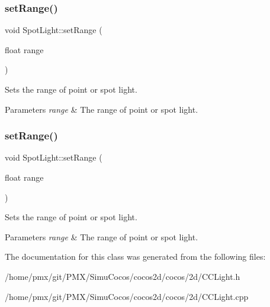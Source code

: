 \subsubsection{\texorpdfstring{set\+Range()}{setRange()}\hspace{0.1cm}{\footnotesize\ttfamily [1/2]}}
{\footnotesize\ttfamily void Spot\+Light\+::set\+Range (\begin{DoxyParamCaption}\item[{float}]{range }\end{DoxyParamCaption})\hspace{0.3cm}{\ttfamily [inline]}}

Sets the range of point or spot light.


\begin{DoxyParams}{Parameters}
{\em range} & The range of point or spot light. \\
\hline
\end{DoxyParams}
\mbox{\label{classSpotLight_aac5c9c4ac4c8e6d91d2d08c64116402b}} 
\subsubsection{\texorpdfstring{set\+Range()}{setRange()}\hspace{0.1cm}{\footnotesize\ttfamily [2/2]}}
{\footnotesize\ttfamily void Spot\+Light\+::set\+Range (\begin{DoxyParamCaption}\item[{float}]{range }\end{DoxyParamCaption})\hspace{0.3cm}{\ttfamily [inline]}}

Sets the range of point or spot light.


\begin{DoxyParams}{Parameters}
{\em range} & The range of point or spot light. \\
\hline
\end{DoxyParams}


The documentation for this class was generated from the following files\+:\begin{DoxyCompactItemize}
\item 
/home/pmx/git/\+P\+M\+X/\+Simu\+Cocos/cocos2d/cocos/2d/C\+C\+Light.\+h\item 
/home/pmx/git/\+P\+M\+X/\+Simu\+Cocos/cocos2d/cocos/2d/C\+C\+Light.\+cpp\end{DoxyCompactItemize}
